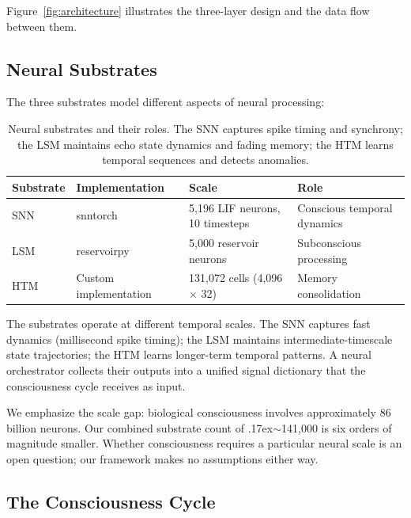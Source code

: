 Figure~\ref{fig:architecture} illustrates the three-layer design and the data flow between them.



\subsection{Neural Substrates}

The three substrates model different aspects of neural processing:

\begin{table}[t]
\centering
\begin{tabular}{llll}
\toprule
\textbf{Substrate} & \textbf{Implementation} & \textbf{Scale} & \textbf{Role} \\
\midrule
SNN & snntorch \cite{eshraghian2023} & 5,196 LIF neurons, 10 timesteps & Conscious temporal dynamics \\
LSM & reservoirpy \cite{trouvain2020} & 5,000 reservoir neurons & Subconscious processing \\
HTM & Custom implementation & 131,072 cells (4,096 $\times$ 32) & Memory consolidation \\
\bottomrule
\end{tabular}
\caption{Neural substrates and their roles. The SNN captures spike timing and synchrony; the LSM maintains echo state dynamics and fading memory; the HTM learns temporal sequences and detects anomalies.}
\label{tab:substrates}
\end{table}

The substrates operate at different temporal scales. The SNN captures fast dynamics (millisecond spike timing); the LSM maintains intermediate-timescale state trajectories; the HTM learns longer-term temporal patterns. A neural orchestrator collects their outputs into a unified signal dictionary that the consciousness cycle receives as input.

We emphasize the scale gap: biological consciousness involves approximately 86 billion neurons. Our combined substrate count of {\raise.17ex\hbox{$\scriptstyle\sim$}}141,000 is six orders of magnitude smaller. Whether consciousness requires a particular neural scale is an open question; our framework makes no assumptions either way.

\subsection{The Consciousness Cycle}

